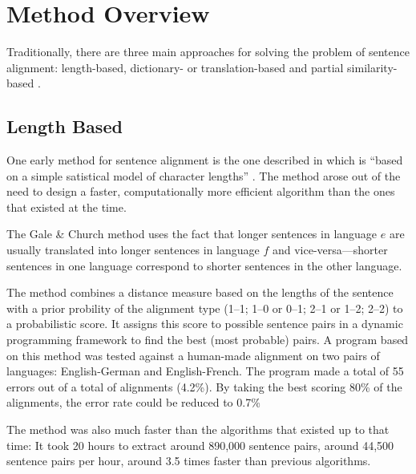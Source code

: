 \section{Method Overview}
\label{sec:overview_senalign}
Traditionally, there are three main approaches for solving the problem of sentence alignment:  length-based, dictionary- or translation-based and partial similarity-based \autocite{hunalign}. 

\subsection{Length Based}
One early method for sentence alignment is the one described in \cite{gale-church-1991-program} which is \enquote{based on a simple satistical model of character lengths} \autocite{gale-church-1991-program}. The method arose out of the need to design a faster, computationally more efficient algorithm than the ones that existed at the time\footnotemark.


The Gale \& Church method uses the fact that longer sentences in language \(e\) are usually translated into longer sentences in language \(f\) and vice-versa---shorter sentences in one language correspond to shorter sentences in the other language.

The method combines a distance measure based on the lengths of the sentence with a prior probility of the alignment type (1--1; 1--0 or 0--1; 2--1 or 1--2; 2--2) to a probabilistic score. 
It assigns this score to possible sentence pairs in a dynamic programming framework to find the best (most probable) pairs. 
A program based on this method was tested against a human-made alignment on two pairs of languages: English-German and English-French. 
The program made a total of 55 errors out of a total of  alignments (4.2\%). 
By taking the best scoring 80\% of the alignments, the error rate could be reduced to 0.7\%

The method was also much faster than the algorithms that existed up to that time: 
It took 20 hours to extract around 890,000 sentence pairs, around 44,500 sentence pairs per hour, around 3.5 times faster than previous algorithms.

